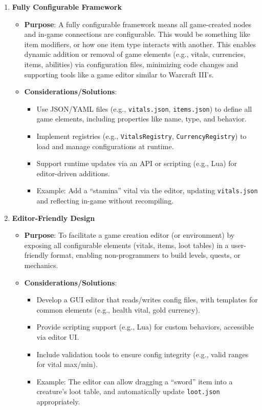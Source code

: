 \begin{enumerate}
    \item \textbf{Fully Configurable Framework}
        \begin{itemize}
            \item \textbf{Purpose}: A fully configurable framework means all game-created nodes and in-game connections are configurable. This would be something like item modifiers, or how one item type interacts with another. This enables dynamic addition or removal of game elements (e.g., vitals, currencies, items, abilities) via configuration files, minimizing code changes and supporting tools like a game editor similar to Warcraft III’s.
            \item \textbf{Considerations/Solutions}:
                \begin{itemize}
                    \item Use JSON/YAML files (e.g., \texttt{vitals.json}, \texttt{items.json}) to define all game elements, including properties like name, type, and behavior.
                    \item Implement registries (e.g., \texttt{VitalsRegistry}, \texttt{CurrencyRegistry}) to load and manage configurations at runtime.
                    \item Support runtime updates via an API or scripting (e.g., Lua) for editor-driven additions.
                    \item Example: Add a ``stamina'' vital via the editor, updating \texttt{vitals.json} and reflecting in-game without recompiling.
                \end{itemize}
        \end{itemize}

    \item \textbf{Editor-Friendly Design}
        \begin{itemize}
            \item \textbf{Purpose}: To facilitate a game creation editor (or environment) by exposing all configurable elements (vitals, items, loot tables) in a user-friendly format, enabling non-programmers to build levels, quests, or mechanics.
            \item \textbf{Considerations/Solutions}:
                \begin{itemize}
                    \item Develop a GUI editor that reads/writes config files, with templates for common elements (e.g., health vital, gold currency).
                    \item Provide scripting support (e.g., Lua) for custom behaviors, accessible via editor UI.
                    \item Include validation tools to ensure config integrity (e.g., valid ranges for vital max/min).
                    \item Example: The editor can allow dragging a ``sword'' item into a creature’s loot table, and automatically update \texttt{loot.json} appropriately.
                \end{itemize}
        \end{itemize}


\end{enumerate}
